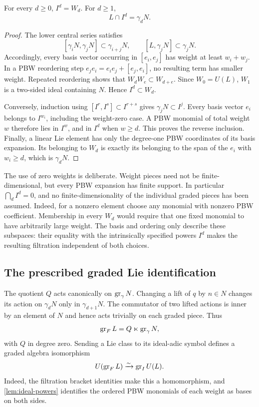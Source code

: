 \begin{lemma}\label{lem:ideal-powers}
For every \(d\geq0\), \(I^d=W_d\). For \(d\geq1\),
\[
 L\cap I^d=\gamma_dN.
\]
\end{lemma}

\begin{proof}
The lower central series satisfies
\[
 [\gamma_iN,\gamma_jN]\subset\gamma_{i+j}N,\qquad
 [L,\gamma_jN]\subset\gamma_jN.
\]
Accordingly, every basis vector occurring in \([e_i,e_j]\)
has weight at least \(w_i+w_j\).
In a PBW reordering step \(e_je_i=e_ie_j+[e_j,e_i]\),
no resulting term has smaller weight. Repeated reordering shows
that \(W_dW_e\subset W_{d+e}\). Since \(W_0=U(L)\), \(W_1\)
is a two-sided ideal containing \(N\). Hence \(I^d\subset W_d\).

Conversely, induction using
\([I^r,I^s]\subset I^{r+s}\) gives \(\gamma_jN\subset I^j\).
Every basis vector \(e_i\) belongs to \(I^{w_i}\), including
the weight-zero case. A PBW monomial of total weight \(w\)
therefore lies in \(I^w\), and in \(I^d\) when \(w\geq d\).
This proves the reverse inclusion.
Finally, a linear Lie element has only the degree-one PBW coordinates
of its basis expansion. Its belonging to \(W_d\) is exactly its
belonging to the span of the \(e_i\) with \(w_i\geq d\),
which is \(\gamma_dN\).
\end{proof}

The use of zero weights is deliberate. Weight pieces need not be
finite-dimensional, but every PBW expansion has finite support.
In particular \(\bigcap_d I^d=0\), and no finite-dimensionality
of the individual graded pieces has been assumed.
Indeed, for a nonzero element choose any monomial with nonzero
PBW coefficient. Membership in every \(W_d\) would require that
one fixed monomial to have arbitrarily large weight.
The basis and ordering only describe these subspaces: their equality
with the intrinsically specified powers \(I^d\) makes the resulting
filtration independent of both choices.

\subsection{The prescribed graded Lie identification}

The quotient \(Q\) acts canonically on \(\operatorname{gr}_\gamma N\).
Changing a lift of \(q\) by \(n\in N\) changes its action on
\(\gamma_dN\) only in \(\gamma_{d+1}N\).
The commutator of two lifted actions is inner by an element of \(N\)
and hence acts trivially on each graded piece. Thus
\[
 \operatorname{gr}_F L=Q\ltimes\operatorname{gr}_\gamma N,
\]
with \(Q\) in degree zero. Sending a Lie class to its ideal-adic
symbol defines a graded algebra isomorphism
\begin{equation}\label{eq:graded-pbw}
 U(\operatorname{gr}_F L)\xrightarrow{\sim}\operatorname{gr}_I U(L).
\end{equation}
Indeed, the filtration bracket identities make this a homomorphism,
and \cref{lem:ideal-powers} identifies the ordered PBW monomials
of each weight as bases on both sides.

